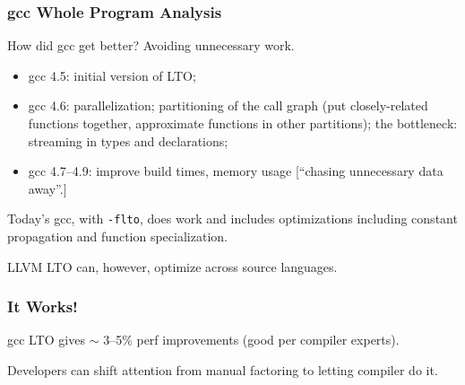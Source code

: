 \begin{frame}
\frametitle{gcc Whole Program Analysis}

{\Large How did gcc get better?  Avoiding unnecessary work. }

\begin{itemize}
\item gcc 4.5: initial version of LTO;
\item gcc 4.6: parallelization; partitioning of the call graph (put closely-related functions together, approximate functions in other partitions); the bottleneck: streaming in types and declarations;
\item gcc 4.7--4.9: improve build times, memory usage [``chasing unnecessary data away''.]
\end{itemize}

Today's gcc, with {\tt -flto}, does work and includes
optimizations including constant propagation and function
specialization.

LLVM LTO can, however, optimize across source languages.

\end{frame}



\begin{frame}
\frametitle{It Works!}

\Large


gcc LTO gives $\sim$ 3--5\% perf improvements (good per compiler experts).


Developers can shift attention from 
manual factoring to letting compiler do it.

\end{frame}





